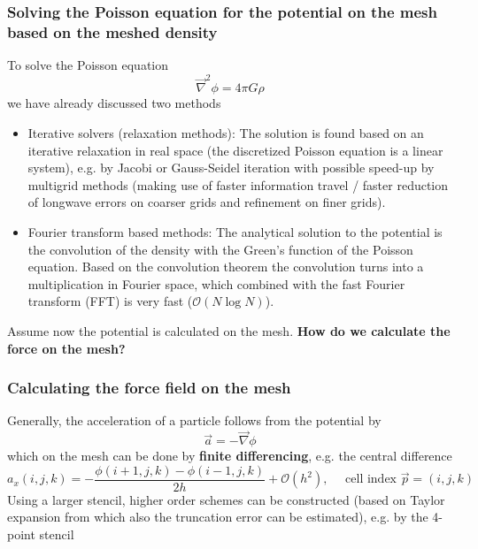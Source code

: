 \subsubsection{Solving the Poisson equation for the potential on the mesh based on the meshed density}
To solve the Poisson equation
\begin{equation}
    \vec{\nabla}^2 \phi = 4 \pi G \rho
\end{equation}
we have already discussed two methods
\begin{itemize}
    \item \textcolor{blue1}{Iterative solvers (relaxation methods)}: The solution is found based on an iterative relaxation in real space (the discretized Poisson equation is a linear system), e.g. by Jacobi or Gauss-Seidel iteration with possible speed-up by multigrid methods (making use of faster information travel / faster reduction of longwave errors on coarser grids and refinement on finer grids).
    \item \textcolor{blue1}{Fourier transform based methods}: The analytical solution to the potential is the convolution of the density with the Green's function of the Poisson equation. Based on the convolution theorem the convolution turns into a multiplication in Fourier space, which combined with the fast Fourier transform (FFT) is very fast ($\mathcal{O}(N \log N)$).
\end{itemize}

Assume now the potential is calculated on the mesh. \textbf{How do we calculate the force on the mesh?}

\subsubsection{Calculating the force field on the mesh}
Generally, the acceleration of a particle follows from the potential by
\begin{equation}
    \vec{a} = -\vec{\nabla} \phi
\end{equation}
which on the mesh can be done by \textbf{finite differencing}, e.g. the central difference
\begin{equation}
    a_x(i, j, k)=-\frac{\phi(i+1, j, k)-\phi(i-1, j, k)}{2 h}+\mathcal{O}\left(h^2\right), \quad \text { cell index } \vec{p}=(i, j, k)
\end{equation}
Using a larger stencil, higher order schemes can be constructed (based on Taylor expansion from which
also the truncation error can be estimated), e.g. by the 4-point stencil

